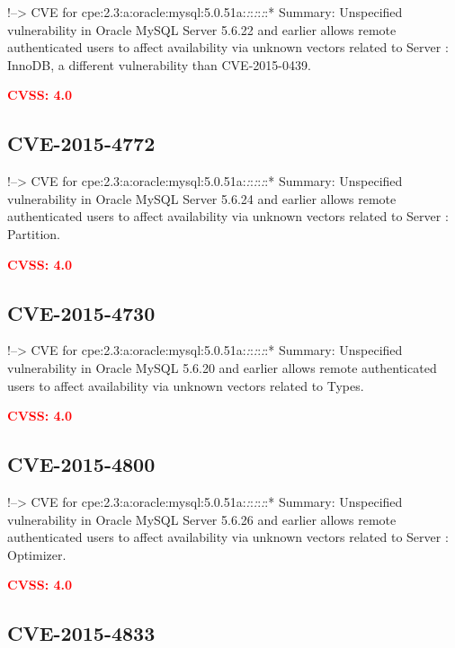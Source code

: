 \documentclass[a4paper, 12pt]{article}
\begin{document}
!--\textgreater{} CVE for
cpe:2.3:a:oracle:mysql:5.0.51a:\emph{:}:\emph{:}:\emph{:}:* Summary:
Unspecified vulnerability in Oracle MySQL Server 5.6.22 and earlier
allows remote authenticated users to affect availability via unknown
vectors related to Server : InnoDB, a different vulnerability than
CVE-2015-0439.

\textbf{\textcolor{red}{CVSS: 4.0}}

\hypertarget{cve-2015-4772}{%
\subsection{CVE-2015-4772}\label{cve-2015-4772}}

!--\textgreater{} CVE for
cpe:2.3:a:oracle:mysql:5.0.51a:\emph{:}:\emph{:}:\emph{:}:* Summary:
Unspecified vulnerability in Oracle MySQL Server 5.6.24 and earlier
allows remote authenticated users to affect availability via unknown
vectors related to Server : Partition.

\textbf{\textcolor{red}{CVSS: 4.0}}

\hypertarget{cve-2015-4730}{%
\subsection{CVE-2015-4730}\label{cve-2015-4730}}

!--\textgreater{} CVE for
cpe:2.3:a:oracle:mysql:5.0.51a:\emph{:}:\emph{:}:\emph{:}:* Summary:
Unspecified vulnerability in Oracle MySQL 5.6.20 and earlier allows
remote authenticated users to affect availability via unknown vectors
related to Types.

\textbf{\textcolor{red}{CVSS: 4.0}}

\hypertarget{cve-2015-4800}{%
\subsection{CVE-2015-4800}\label{cve-2015-4800}}

!--\textgreater{} CVE for
cpe:2.3:a:oracle:mysql:5.0.51a:\emph{:}:\emph{:}:\emph{:}:* Summary:
Unspecified vulnerability in Oracle MySQL Server 5.6.26 and earlier
allows remote authenticated users to affect availability via unknown
vectors related to Server : Optimizer.

\textbf{\textcolor{red}{CVSS: 4.0}}

\hypertarget{cve-2015-4833}{%
\subsection{CVE-2015-4833}\label{cve-2015-4833}}
\end{document}
